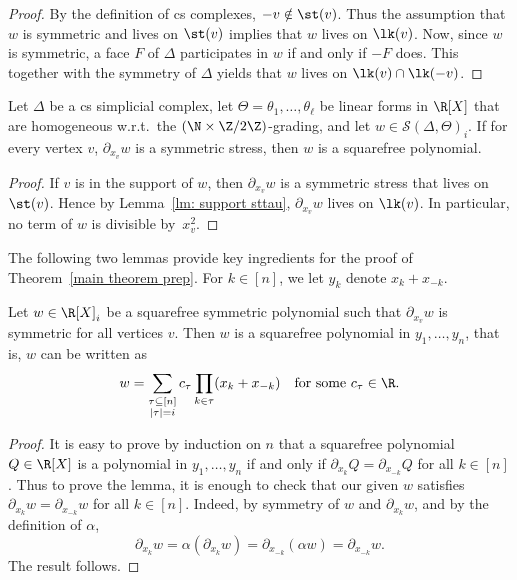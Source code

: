 \begin{proof} By the definition of cs complexes, $-v\notin \st(v)$. Thus the assumption that $w$ is symmetric and lives on $\st(v)$ implies that $w$ lives on $\lk(v)$. Now, since $w$ is symmetric, a face $F$ of $\Delta$ participates in $w$ if and only if $-F$ does. This together with the symmetry of $\Delta$ yields that $w$ lives on $\lk(v)\cap\lk(-v)$.
\end{proof}

\begin{lemma} \label{lm: squarefree}
Let $\Delta$ be a cs simplicial complex, let $\Theta=\theta_1,\ldots,\theta_\ell$ be linear forms in $\R[X]$ that are homogeneous w.r.t.~the $(\N \times \Z/2\Z)$-grading, and let $w\in \mathcal{S}(\Delta, \Theta)_i$. If for every vertex $v$, $\partial_{x_v} w$ is a symmetric stress, then $w$ is a squarefree polynomial.
\end{lemma}

\begin{proof}
 If $v$ is in the support of $w$, then $\partial_{x_v}w$ is a symmetric stress that lives on $\st(v)$. Hence by Lemma~\ref{lm: support sttau}, $\partial_{x_v}w$ lives on $\lk(v)$. In particular, no term of $w$ is divisible by~$x_v^2$.
\end{proof}

The following two lemmas provide key ingredients for the proof of Theorem~\ref{main theorem prep}. For $k\in [n]$, we let $y_k$ denote $x_k+x_{-k}$.

\begin{lemma}\label{lm: symmetric stress expression}
Let $w \in \R[X]_i$ be a squarefree symmetric polynomial such that $\partial_{x_v} w$ is symmetric for all vertices $v$. Then $w$ is a squarefree polynomial in $y_1,\ldots,y_n$, that is, $w$ can be written as $$w=\sum_{\substack{\tau\subseteq [n]\\|\tau|=i}} c_\tau \prod_{k\in \tau} (x_k+x_{-k}) \quad \mbox{for some $c_\tau\in \R$}.$$ 
\end{lemma}
\begin{proof}
 It is easy to prove by induction on $n$ that a squarefree polynomial $Q\in\R[X]$ is a polynomial in $y_1,\ldots,y_n$ if and only if $\partial_{x_{k}}Q=\partial_{x_{-k}}Q$ for all $k\in [n]$. Thus 
to prove the lemma, it is enough to check that our given $w$ satisfies $\partial_{x_{k}}w=\partial_{x_{-k}}w$ for all $k\in [n]$. Indeed, by symmetry of $w$ and $\partial_{x_k} w$, and by the definition of $\alpha$,
\[ 
\partial_{x_{k}}w=\alpha(\partial_{x_{k}}w)=\partial_{x_{-k}} (\alpha w)=\partial_{x_{-k}} w.
\]
The result follows.
\end{proof}


